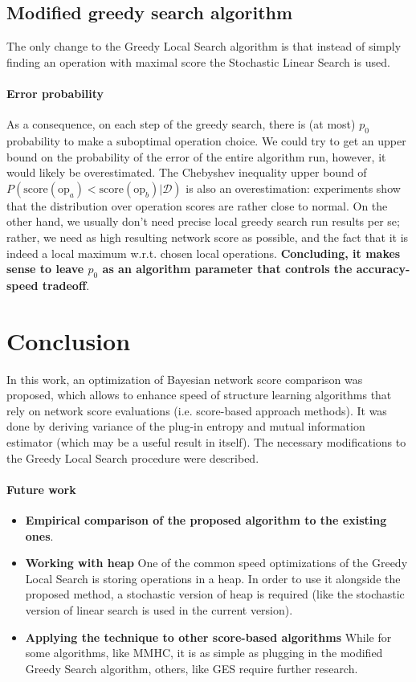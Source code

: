 \documentclass{article}
\newcommand{\score}[1]{\textrm{score}(#1)}
\begin{document}
\subsection{Modified greedy search algorithm}
The only change to the Greedy Local Search algorithm is that instead of simply finding an operation with maximal score the Stochastic Linear Search is used. 

\paragraph{Error probability} As a consequence, on each step of the greedy search, there is (at most) $p_0$ probability to make a suboptimal operation choice. We could try to get an upper bound on the probability of the error of the entire algorithm run, however, it would likely be overestimated. The Chebyshev inequality upper bound of $P(\score{\textrm{op}_a} < \score{\textrm{op}_b} | \mathcal{D})$ is also an overestimation: experiments show that the distribution over operation scores are rather close to normal. On the other hand, we usually don't need precise local greedy search run results per se; rather, we need as high resulting network score as possible, and the fact that it is indeed a local maximum w.r.t. chosen local operations. \textbf{Concluding, it makes sense to leave $p_0$ as an algorithm parameter that controls the accuracy-speed tradeoff}.

\section{Conclusion}
In this work, an optimization of Bayesian network score comparison was proposed, which allows to enhance speed of structure learning algorithms that rely on network score evaluations (i.e. score-based approach methods). It was done by deriving variance of the plug-in entropy and mutual information estimator (which may be a useful result in itself). The necessary modifications to the Greedy Local Search procedure were described. 

\paragraph{Future work}
\begin{itemize}
	\item \textbf{Empirical comparison of the proposed algorithm to the existing ones}.
	\item \textbf{Working with heap} One of the common speed optimizations of the Greedy Local Search is storing operations in a heap. In order to use it alongside the proposed method, a stochastic version of heap is required (like the stochastic version of linear search is used in the current version).
	\item \textbf{Applying the technique to other score-based algorithms} While for some algorithms, like MMHC, it is as simple as plugging in the modified Greedy Search algorithm, others, like GES require further research. 
	\end{itemize}
\end{document}
